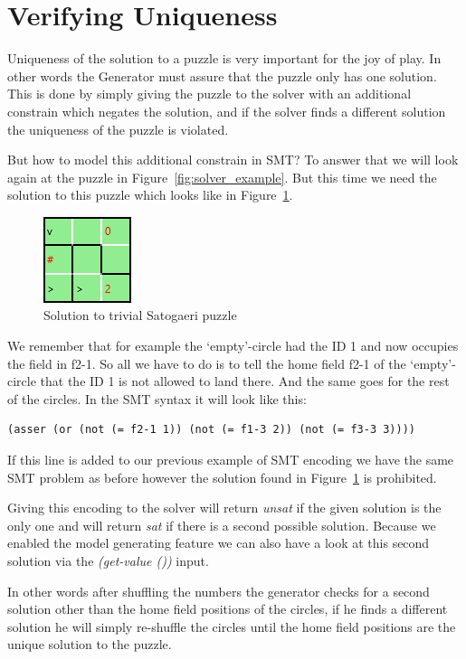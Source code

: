 \section{Verifying Uniqueness}
Uniqueness of the solution to a puzzle is very important for the joy of play. In other words the Generator must assure that the puzzle only has one solution. This is done by simply giving the puzzle to the solver with an additional constrain which negates the solution, and if the solver finds a different solution the uniqueness of the puzzle is violated.

But how to model this additional constrain in SMT? To answer that we will look again at the puzzle in Figure~\ref{fig:solver_example}. But this time we need the solution to this puzzle which looks like in Figure~\ref{fig:solver_example_solution}.
\begin{figure}
  \centering
  \includegraphics[scale=1]{Pictures/solver_example_solution.png} 
  \caption{Solution to trivial Satogaeri puzzle}
  \label{fig:solver_example_solution}
\end{figure}
We remember that for example the `empty'-circle had the ID 1 and now occupies the field in f2-1. So all we have to do is to tell the home field f2-1 of the `empty'-circle that the ID 1 is not allowed to land there. And the same goes for the rest of the circles. In the SMT syntax it will look like this:
\begin{lstlisting}
(asser (or (not (= f2-1 1)) (not (= f1-3 2)) (not (= f3-3 3))))
\end{lstlisting}
If this line is added to our previous example of SMT encoding we have the same SMT problem as before however the solution found in Figure~\ref{fig:solver_example_solution} is prohibited.

Giving this encoding to the solver will return \emph{unsat} if the given solution is the only one and will return \emph{sat} if there is a second possible solution. Because we enabled the model generating feature we can also have a look at this second solution via the \emph{(get-value ())} input.

In other words after shuffling the numbers the generator checks for a second solution other than the home field positions of the circles, if he finds a different solution he will simply re-shuffle the circles until the home field positions are the unique solution to the puzzle.

